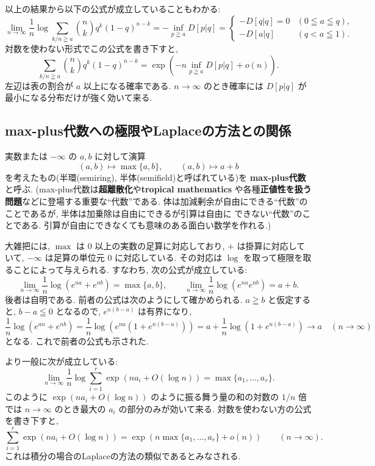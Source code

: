 \documentclass[12pt,twoside]{jarticle}
\theoremstyle{definition} %
\theoremstyle{definition} %
\theoremstyle{definition} %
\numberwithin{theorem}{section}
\numberwithin{equation}{section}
\numberwithin{figure}{section}
\numberwithin{table}{section}
\begin{document}
以上の結果から以下の公式が成立していることもわかる:
\[
\lim_{n\to\infty}
\frac{1}{n}\log\sum_{k/n\geqq a} \binom{n}{k}q^k(1-q)^{n-k}
=-\inf_{p\geqq a} D[p|q]
=
\begin{cases}
-D[q|q]=0 & (0\leqq a\leqq q), \\
-D[a|q]   & (q<a\leqq 1).
\end{cases}
\]
対数を使わない形式でこの公式を書き下すと,
\[
\sum_{k/n\geqq a} \binom{n}{k}q^k(1-q)^{n-k}
=
\exp\left(-n\inf_{p\geqq a}D[p|q] + o(n)\right).
\]
左辺は表の割合が $a$ 以上になる確率である.
$n\to\infty$ のとき確率には $D[p|q]$ が最小になる分布だけが強く効いて来る.



\subsection{max-plus代数への極限やLaplaceの方法との関係}

実数または $-\infty$ の $a,b$ に対して演算
\[
(a,b)\mapsto\max\{a,b\}, \qquad
(a,b)\mapsto a+b
\]
を考えたもの(半環(semiring), 半体(semifield)と呼ばれている)を
{\bf max-plus代数}と呼ぶ.
(max-plus代数は{\bf 超離散化}や{\bf tropical mathematics} 
や各種{\bf 正値性を扱う問題}などに登場する重要な``代数''である. 
体は加減剰余が自由にできる``代数''のことであるが, 
半体は加乗除は自由にできるが引算は自由に
できない``代数''のことである.
引算が自由にできなくても意味のある面白い数学を作れる.)

大雑把には, $\max$ は $0$ 以上の実数の足算に対応しており, 
$+$ は掛算に対応していて, $-\infty$ は足算の単位元 $0$ に対応している.
その対応は $\log$ を取って極限を取ることによって与えられる.
すなわち, 次の公式が成立している:
\[
\lim_{n\to\infty}\frac{1}{n}\log(e^{na}+e^{nb})=\max\{a,b\}, \qquad
\lim_{n\to\infty}\frac{1}{n}\log(e^{na}e^{nb})=a+b.
\]
後者は自明である.
前者の公式は次のようにして確かめられる. 
$a\geqq b$ と仮定すると, $b-a\leqq 0$ となるので, 
$e^{n(b-a)}$ は有界になり, 
\[
\frac{1}{n}\log(e^{an}+e^{nb})
=\frac{1}{n}\log\left(e^{na}\left(1+e^{n(b-a)}\right)\right)
=a+\frac{1}{n}\log\left(1+e^{n(b-a)}\right)
\to a
\quad (n\to\infty)
\]
となる. これで前者の公式も示された.

より一般に次が成立している:
\[
\lim_{n\to\infty}\frac{1}{n}\log\sum_{i=1}^r \exp(na_i+O(\log n)) 
= \max\{a_1,\ldots,a_r\}.
\]
このように $\exp(na_i+O(\log n))$ のように振る舞う量の和の対数の $1/n$ 倍では
$n\to\infty$ のとき最大の $a_i$ の部分のみが効いて来る.
対数を使わない方の公式を書き下すと, 
\[
\sum_{i=1}^r \exp(na_i+O(\log n))
=
\exp(n\max\{a_1,\ldots,a_r\}+o(n))
\qquad
(n\to\infty).
\]
これは積分の場合のLaplaceの方法の類似であるとみなされる.
\end{document}
